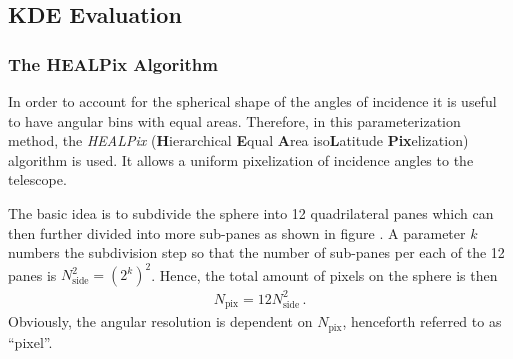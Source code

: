\subsection{KDE Evaluation}

\subsubsection{The HEALPix Algorithm}

In order to account for the spherical shape of the angles of incidence it is useful to have angular bins with equal areas. Therefore, in this parameterization method, the \textit{HEALPix} (\textbf{H}ierarchical \textbf{E}qual \textbf{A}rea iso\textbf{L}atitude \textbf{Pix}elization) algorithm is used. It allows a uniform pixelization of incidence angles to the telescope.\\


The basic idea is to subdivide the sphere into 12 quadrilateral panes which can then further divided into more sub-panes as shown in figure . A parameter $k$ numbers the subdivision step so that the number of sub-panes per each of the 12 panes is $N_{\text{side}}^2=\left(2^k\right)^2$. Hence, the total amount of pixels on the sphere is then
\begin{align}
N_\text{pix} = 12N_\text{side}^2\,.
\label{eq:npix}
\end{align}
Obviously, the angular resolution is dependent on $N_\text{pix}$, henceforth referred to as \enquote{pixel}.

